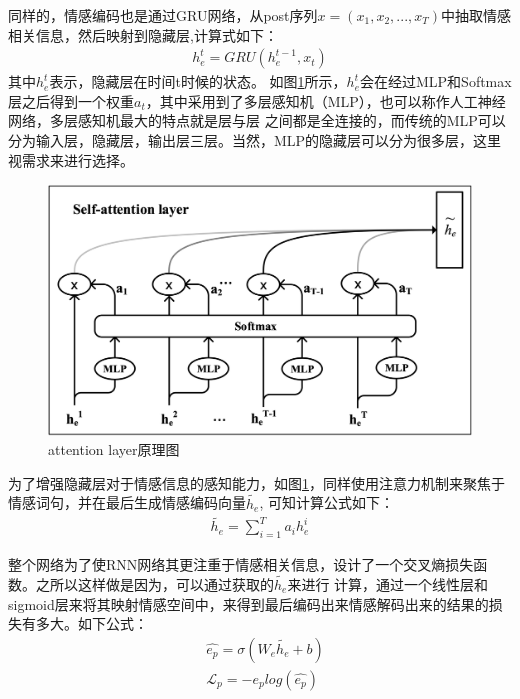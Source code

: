 \documentclass[supercite]{HustGraduPaper}
\theoremstyle{definition}
\begin{document}
同样的，情感编码也是通过GRU网络，从post序列$x = (x_1,x_2,...,x_T)$中抽取情感相关信息，然后映射到隐藏层,计算式如下：
\begin{align}
  h_e^t = GRU(h_e^{t-1},x_t) \label{3.6}
\end{align}
其中$h_e^t$表示，隐藏层在时间t时候的状态。
如图\ref{Fig.attentionemotion}所示，$h_e^t$会在经过MLP和Softmax层之后得到一个权重$a_t$，其中采用到了多层感知机（MLP），也可以称作人工神经网络，多层感知机最大的特点就是层与层
之间都是全连接的，而传统的MLP可以分为输入层，隐藏层，输出层三层。当然，MLP的隐藏层可以分为很多层，这里视需求来进行选择。
\begin{figure}[!htb] %
  \centering %
  \includegraphics[width=1\textwidth]{images/attentionemotion.png} %
  \caption{attention layer原理图} %
  \label{Fig.attentionemotion} %
\end{figure}

为了增强隐藏层对于情感信息的感知能力，如图\ref{Fig.attentionemotion}，同样使用注意力机制来聚焦于情感词句，并在最后生成情感编码向量$\widetilde{h_e}$,
可知计算公式如下：
\begin{align}
  \widetilde{h_e} = \sum_{i=1}^{T}a_i h_e^i \label{3.7}
\end{align}

整个网络为了使RNN网络其更注重于情感相关信息，设计了一个交叉熵损失函数。之所以这样做是因为，可以通过获取的$\widetilde{h_e}$来进行
计算，通过一个线性层和sigmoid层来将其映射情感空间中，来得到最后编码出来情感解码出来的结果的损失有多大。如下公式：
\begin{align}
  &\hat{e_p} = \sigma(W_e \widetilde{h_e} + b) \label{3.8}\\
  &\mathcal{L}_p = -e_p log(\hat{e_p}) \label{3.9}
\end{align}
\end{document}
